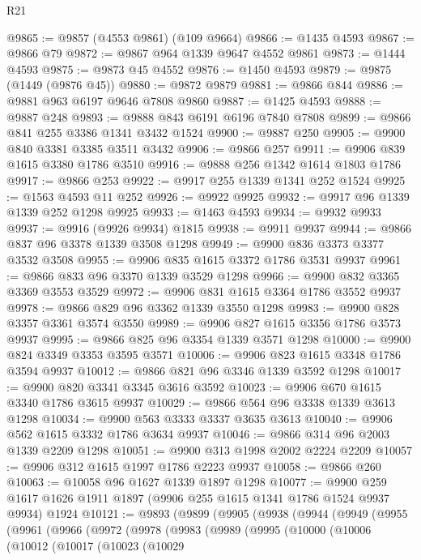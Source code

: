 \begin{lexlean}{R21}
\begin{coremodule}
@9865 := @9857 (@4553 @9861) (@109 @9664)
@9866 := @1435 @4593
@9867 := @9866 @79
@9872 := @9867 @964 @1339 @9647 @4552 @9861
@9873 := @1444 @4593
@9875 := @9873 @45 @4552
@9876 := @1450 @4593
@9879 := @9875 (@1449 (@9876 @45))
@9880 := @9872 @9879
@9881 := @9866 @844
@9886 := @9881 @963 @6197 @9646 @7808 @9860
@9887 := @1425 @4593
@9888 := @9887 @248
@9893 := @9888 @843 @6191 @6196 @7840 @7808
@9899 := @9866 @841 @255 @3386 @1341 @3432 @1524
@9900 := @9887 @250
@9905 := @9900 @840 @3381 @3385 @3511 @3432
@9906 := @9866 @257
@9911 := @9906 @839 @1615 @3380 @1786 @3510
@9916 := @9888 @256 @1342 @1614 @1803 @1786
@9917 := @9866 @253
@9922 := @9917 @255 @1339 @1341 @252 @1524
@9925 := @1563 @4593 @11 @252
@9926 := @9922 @9925
@9932 := @9917 @96 @1339 @1339 @252 @1298 @9925
@9933 := @1463 @4593
@9934 := @9932 @9933
@9937 := @9916 (@9926 @9934) @1815
@9938 := @9911 @9937
@9944 := @9866 @837 @96 @3378 @1339 @3508 @1298
@9949 := @9900 @836 @3373 @3377 @3532 @3508
@9955 := @9906 @835 @1615 @3372 @1786 @3531 @9937
@9961 := @9866 @833 @96 @3370 @1339 @3529 @1298
@9966 := @9900 @832 @3365 @3369 @3553 @3529
@9972 := @9906 @831 @1615 @3364 @1786 @3552 @9937
@9978 := @9866 @829 @96 @3362 @1339 @3550 @1298
@9983 := @9900 @828 @3357 @3361 @3574 @3550
@9989 := @9906 @827 @1615 @3356 @1786 @3573 @9937
@9995 := @9866 @825 @96 @3354 @1339 @3571 @1298
@10000 := @9900 @824 @3349 @3353 @3595 @3571
@10006 := @9906 @823 @1615 @3348 @1786 @3594 @9937
@10012 := @9866 @821 @96 @3346 @1339 @3592 @1298
@10017 := @9900 @820 @3341 @3345 @3616 @3592
@10023 := @9906 @670 @1615 @3340 @1786 @3615 @9937
@10029 := @9866 @564 @96 @3338 @1339 @3613 @1298
@10034 := @9900 @563 @3333 @3337 @3635 @3613
@10040 := @9906 @562 @1615 @3332 @1786 @3634 @9937
@10046 := @9866 @314 @96 @2003 @1339 @2209 @1298
@10051 := @9900 @313 @1998 @2002 @2224 @2209
@10057 := @9906 @312 @1615 @1997 @1786 @2223 @9937
@10058 := @9866 @260
@10063 := @10058 @96 @1627 @1339 @1897 @1298
@10077 := @9900 @259 @1617 @1626 @1911 @1897 (@9906 @255 @1615 @1341 @1786 @1524 @9937 @9934) @1924
@10121 := @9893
    (@9899
      (@9905
        (@9938
          (@9944
            (@9949
              (@9955
                (@9961
                  (@9966
                    (@9972
                      (@9978
                        (@9983
                          (@9989
                            (@9995
                              (@10000
                                (@10006
                                  (@10012
                                    (@10017
                                      (@10023
                                        (@10029

\end{coremodule}
\end{lexlean}
